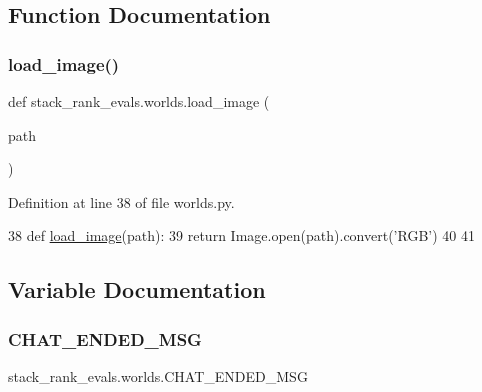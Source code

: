 \subsection{Function Documentation}
\mbox{\label{namespacestack__rank__evals_1_1worlds_a0174c3e372a345f192cef824e4c5528d}} 
\subsubsection{\texorpdfstring{load\+\_\+image()}{load\_image()}}
{\footnotesize\ttfamily def stack\+\_\+rank\+\_\+evals.\+worlds.\+load\+\_\+image (\begin{DoxyParamCaption}\item[{}]{path }\end{DoxyParamCaption})}



Definition at line 38 of file worlds.\+py.


\begin{DoxyCode}
38 \textcolor{keyword}{def }\hyperlink{namespacepersonality__captions_1_1worlds_a2863737d97a8e8c5a1ebe9029d0d2293}{load\_image}(path):
39     \textcolor{keywordflow}{return} Image.open(path).convert(\textcolor{stringliteral}{'RGB'})
40 
41 
\end{DoxyCode}


\subsection{Variable Documentation}
\mbox{\label{namespacestack__rank__evals_1_1worlds_a71080d86e00a5024b9b9b0d61eb778de}} 
\subsubsection{\texorpdfstring{C\+H\+A\+T\+\_\+\+E\+N\+D\+E\+D\+\_\+\+M\+SG}{CHAT\_ENDED\_MSG}}
{\footnotesize\ttfamily stack\+\_\+rank\+\_\+evals.\+worlds.\+C\+H\+A\+T\+\_\+\+E\+N\+D\+E\+D\+\_\+\+M\+SG}



